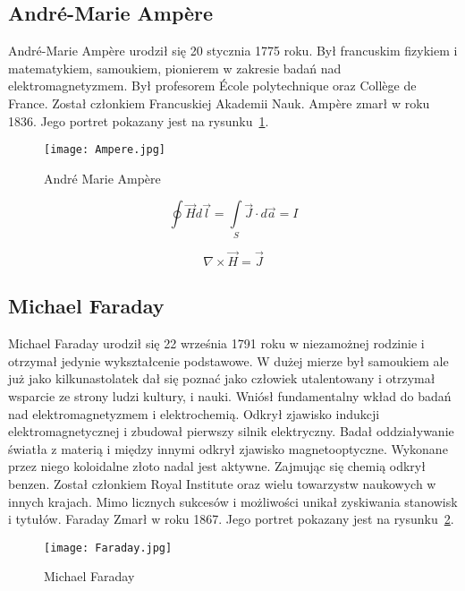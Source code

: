 \subsection{André-Marie Ampère}
André-Marie Ampère urodził się 20 stycznia 1775 roku. Był francuskim fizykiem i matematykiem, samoukiem, pionierem w zakresie badań nad elektromagnetyzmem. Był profesorem École polytechnique oraz Collège de France. Został członkiem Francuskiej Akademii Nauk. Ampère zmarł w roku 1836. Jego portret pokazany jest na rysunku~\ref{rys:ampere}.

\begin{figure}[!hb]
	\centering \texttt{[image: Ampere.jpg]}
	\caption{André Marie Ampère}
	\label{rys:ampere}
\end{figure}

\begin{equation}
	\oint \vec{H} d\vec{l} = \int\limits_{S} \vec{J} \cdot d \vec{a} = I
\end{equation}

\begin{equation}
	\nabla \times \vec{H} = \vec{J}
\end{equation}

\subsection{Michael Faraday}
Michael Faraday urodził się 22 września 1791 roku w niezamożnej rodzinie i otrzymał jedynie wykształcenie podstawowe. W dużej mierze był samoukiem ale już jako kilkunastolatek dał się poznać jako człowiek utalentowany i otrzymał wsparcie ze strony ludzi kultury, i nauki. Wniósł fundamentalny wkład do badań nad elektromagnetyzmem i elektrochemią. Odkrył zjawisko indukcji elektromagnetycznej i zbudował pierwszy silnik elektryczny. Badał oddziaływanie światła z materią i między innymi odkrył zjawisko magnetooptyczne. Wykonane przez niego koloidalne złoto nadal jest aktywne. Zajmując się chemią odkrył benzen. Został członkiem Royal Institute oraz wielu towarzystw naukowych w innych krajach. Mimo licznych sukcesów i możliwości unikał zyskiwania stanowisk i tytułów. Faraday Zmarł w roku 1867. Jego portret pokazany jest na rysunku~\ref{rys:faraday}.

\begin{figure}[!hb]
	\centering \texttt{[image: Faraday.jpg]}
	\caption{Michael Faraday}
	\label{rys:faraday}
\end{figure}

